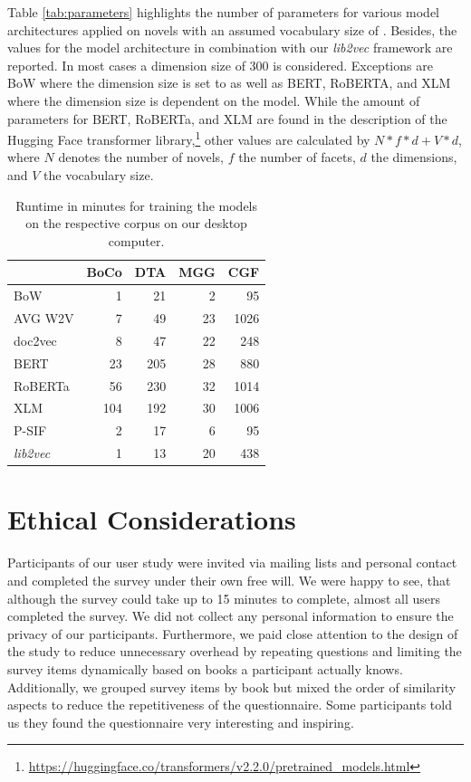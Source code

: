 \documentclass[11pt]{article}
\begin{document}
Table \ref{tab:parameters} highlights the number of parameters for various model architectures applied on  novels with an assumed vocabulary size of . 
Besides, the values for the model architecture in combination with our \emph{lib2vec} framework are reported.
In most cases a dimension size of 300 is considered.
Exceptions are BoW where the dimension size is set to  as well as BERT, RoBERTA, and XLM where the dimension size is dependent on the model.
While the amount of parameters for BERT, RoBERTa, and XLM are found in the description of the Hugging Face transformer library,\footnote{\url{https://huggingface.co/transformers/v2.2.0/pretrained_models.html}} other values are calculated by $N*f*d + V*d$, where $N$ denotes the number of novels, $f$ the number of facets, $d$ the dimensions, and $V$ the vocabulary size.

\begin{table}
	\centering
\begin{tabular}{@{}lrrrr@{}}
	\toprule
	& BoCo & DTA & MGG & CGF  \\ \midrule
	BoW     & 1   & 21  & 2   & 95   \\
	AVG W2V & 7   & 49  & 23  & 1026 \\
	doc2vec & 8   & 47  & 22  & 248  \\
	BERT    & 23  & 205 & 28  & 880  \\
	RoBERTa & 56  & 230 & 32  & 1014 \\
	XLM     & 104 & 192 & 30  & 1006 \\
	P-SIF   & 2   & 17  & 6   & 95   \\
	\emph{lib2vec} & 1   & 13  & 20  & 438 \\
	\bottomrule
\end{tabular}
	\caption[]{Runtime in minutes for training the models on the respective corpus on our desktop computer.}
	\label{tab:runtimes}
\end{table}

\section{Ethical Considerations}
Participants of our user study were invited via mailing lists and personal contact and completed the survey under their own free will.
We were happy to see, that although the survey could take up to 15 minutes to complete, almost all users completed the survey.
We did not collect any personal information to ensure the privacy of our participants.
Furthermore, we paid close attention to the design of the study to reduce unnecessary overhead by repeating questions and limiting the survey items dynamically based on books a participant actually knows.
Additionally, we grouped survey items by book but mixed the order of similarity aspects to reduce the repetitiveness of the questionnaire.
Some participants told us they found the questionnaire very interesting and inspiring.
\end{document}
